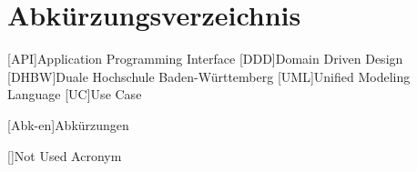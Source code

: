%                                              
%

\chapter*{Abkürzungsverzeichnis} %

\begin{acronym}[12345678910]
  	[API]{Application Programming Interface}
  	[DDD]{Domain Driven Design}
	[DHBW]{Duale Hochschule Baden-Württemberg}
	[UML]{Unified Modeling Language}
	[UC]{Use Case}


	[Abk-en]{Abkürzungen}

	[]{Not Used Acronym}
	
\end{acronym}
